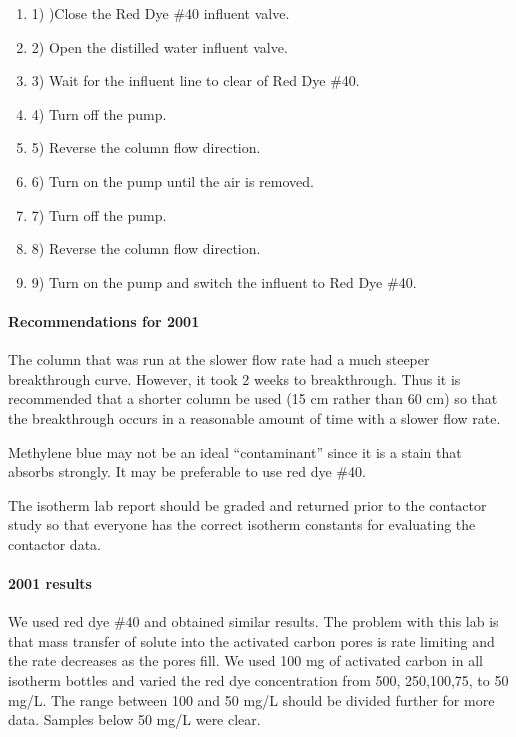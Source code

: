 \documentclass{article} %
\begin{document}
\noindent \begin{enumerate}
\item 1) )Close the Red Dye \#40 influent valve.

\noindent \item 2) Open the distilled water influent valve.

\noindent \item 3) Wait for the influent line to clear of Red Dye \#40.

\noindent \item 4) Turn off the pump.

\noindent \item 5) Reverse the column flow direction.

\noindent \item 6) Turn on the pump until the air is removed.

\noindent \item 7) Turn off the pump.

\noindent \item 8) Reverse the column flow direction.

\noindent \item 9) Turn on the pump and switch the influent to Red Dye \#40.
\end{enumerate}

\noindent 
\paragraph{Recommendations for 2001}

The column that was run at the slower flow rate had a much steeper breakthrough curve. However, it took 2 weeks to breakthrough. Thus it is recommended that a shorter column be used (15 cm rather than 60 cm) so that the breakthrough occurs in a reasonable amount of time with a slower flow rate.

Methylene blue may not be an ideal ``contaminant'' since it is a stain that absorbs strongly. It may be preferable to use red dye \#40.

The isotherm lab report should be graded and returned prior to the contactor study so that everyone has the correct isotherm constants for evaluating the contactor data.

\noindent 
\paragraph{2001 results}

We used red dye \#40 and obtained similar results. The problem with this lab is that mass transfer of solute into the activated carbon pores is rate limiting and the rate decreases as the pores fill. We used 100 mg of activated carbon in all isotherm bottles and varied the red dye concentration from 500, 250,100,75, to 50 mg/L. The range between 100 and 50 mg/L should be divided further for more data. Samples below 50 mg/L were clear.
\end{document}

